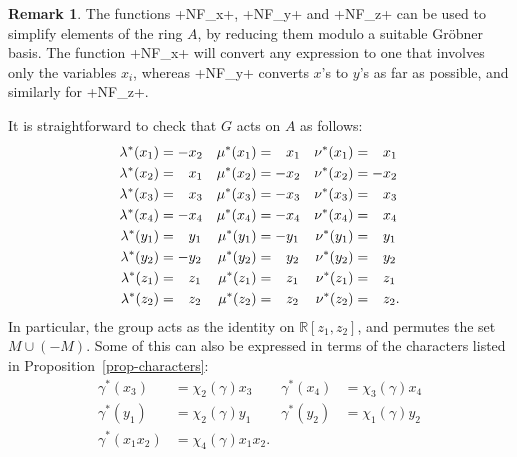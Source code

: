 \documentclass[reqno]{amsart}
\newcommand{\gm}        {\gamma}
\newcommand{\lm}        {\lambda}
\newcommand{\R}         {{\mathbb{R}}}
\newcommand{\pp}        {\hphantom{+}}
\renewcommand{\:}{\colon}
\theoremstyle{definition}
\newtheorem{remark}[theorem]{Remark}
\begin{document}
\begin{remark}
 The functions \mcode+NF_x+, \mcode+NF_y+ and \mcode+NF_z+ can be used
 to simplify elements of the ring $A$, by reducing them modulo a
 suitable Gr\"obner basis.  The function \mcode+NF_x+ will convert any
 expression to one that involves only the variables $x_i$, whereas
 \mcode+NF_y+ converts $x$'s to $y$'s as far as possible, and
 similarly for \mcode+NF_z+.
\end{remark}

It is straightforward to check that $G$ acts on $A$ as follows:
\begin{align*}
 \lm^*(x_1) &=    -x_2 & \mu^*(x_1) &= \pp x_1 & \nu^*(x_1) &= \pp x_1 \\
 \lm^*(x_2) &= \pp x_1 & \mu^*(x_2) &=    -x_2 & \nu^*(x_2) &=    -x_2 \\
 \lm^*(x_3) &= \pp x_3 & \mu^*(x_3) &=    -x_3 & \nu^*(x_3) &= \pp x_3 \\
 \lm^*(x_4) &=    -x_4 & \mu^*(x_4) &=    -x_4 & \nu^*(x_4) &= \pp x_4 \\
 \lm^*(y_1) &= \pp y_1 & \mu^*(y_1) &=    -y_1 & \nu^*(y_1) &= \pp y_1 \\
 \lm^*(y_2) &=    -y_2 & \mu^*(y_2) &= \pp y_2 & \nu^*(y_2) &= \pp y_2 \\
 \lm^*(z_1) &= \pp z_1 & \mu^*(z_1) &= \pp z_1 & \nu^*(z_1) &= \pp z_1 \\
 \lm^*(z_2) &= \pp z_2 & \mu^*(z_2) &= \pp z_2 & \nu^*(z_2) &= \pp z_2.
\end{align*}
In particular, the group acts as the identity on $\R[z_1,z_2]$, and
permutes the set $M\cup(-M)$.  Some of this can also be expressed in
terms of the characters listed in Proposition~\ref{prop-characters}:
\begin{align*}
 \gm^*(x_3) &= \chi_2(\gm) x_3 &
 \gm^*(x_4) &= \chi_3(\gm) x_4 \\
 \gm^*(y_1) &= \chi_2(\gm) y_1 &
 \gm^*(y_2) &= \chi_1(\gm) y_2 \\
 \gm^*(x_1x_2) &= \chi_4(\gm)x_1x_2.
\end{align*}
\end{document}

